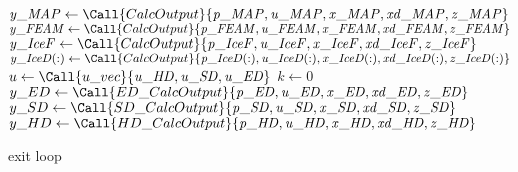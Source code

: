 \documentclass[10pt,letterpaper,oneside,notitlepage]{article}
\begin{document}
\begin{algorithmic}[1]

	\State
	\State $\mathit{y\_MAP}  \gets \Call{CalcOutput}{\mathit{p\_MAP},\mathit{u\_MAP},\mathit{x\_MAP},\mathit{xd\_MAP},\mathit{z\_MAP}}$ 
	\State $\mathit{y\_FEAM} \gets \Call{CalcOutput}{\mathit{p\_FEAM},\mathit{u\_FEAM},\mathit{x\_FEAM},\mathit{xd\_FEAM},\mathit{z\_FEAM}}$
	\State $\mathit{y\_IceF} \gets \Call{CalcOutput}{\mathit{p\_IceF},\mathit{u\_IceF},\mathit{x\_IceF},\mathit{xd\_IceF},\mathit{z\_IceF}}$
	\State $\mathit{y\_IceD(:)} \gets \Call{CalcOutput}{\mathit{p\_IceD(:)},\mathit{u\_IceD(:)},\mathit{x\_IceD(:)},\mathit{xd\_IceD(:)},\mathit{z\_IceD(:)}}$
	\State
	\State{}
	\State
	\State $u \gets \Call{u\_vec}{\mathit{u\_HD},\mathit{u\_SD},\mathit{u\_ED}}$
	\State $k \gets 0$
	\Loop{}
		\State $y\_ED \gets \Call{ED\_CalcOutput}{\mathit{p\_ED},\mathit{u\_ED},\mathit{x\_ED},\mathit{xd\_ED},\mathit{z\_ED}}$
		\State $y\_SD \gets \Call{SD\_CalcOutput}{\mathit{p\_SD},\mathit{u\_SD},\mathit{x\_SD},\mathit{xd\_SD},\mathit{z\_SD}}$
		\State $y\_HD \gets \Call{HD\_CalcOutput}{\mathit{p\_HD},\mathit{u\_HD},\mathit{x\_HD},\mathit{xd\_HD},\mathit{z\_HD}}$
	
			\State exit loop
		\EndIf
		

\end{algorithmic}
\end{document}
